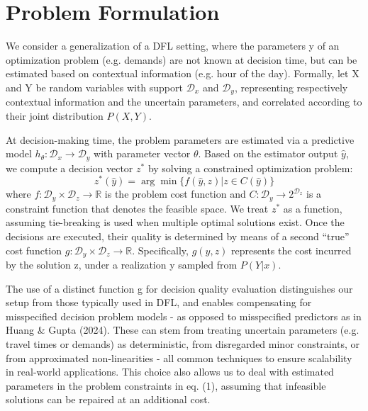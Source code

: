 \section{Problem Formulation}

We consider a generalization of a DFL setting, where the parameters y of an optimization problem (e.g. demands) are not known at decision time, but can be estimated based on contextual information (e.g. hour of the day). %
Formally, let X and Y be random variables with support $\mathcal{D}_{x}$ and $\mathcal{D}_{y}$, representing respectively contextual information and the uncertain parameters, and correlated according to their joint distribution $P(X,Y)$. %

At decision-making time, the problem parameters are estimated via a predictive model $h_{\theta}:\mathcal{D}_{x}\rightarrow \mathcal{D}_{y}$ with parameter vector $\theta$. %
Based on the estimator output $\hat{y}$, we compute a decision vector $z^{*}$ by solving a constrained optimization problem: %
\begin{equation}
    z^{*}(\hat{y})=\arg\min\{f(\hat{y},z)|z\in C(\hat{y})\} %
\end{equation}
where $f:\mathcal{D}_{y}\times \mathcal{D}_{z}\rightarrow\mathbb{R}$ is the problem cost function and $C:\mathcal{D}_{y}\rightarrow 2^{\mathcal{D}_{z}}$ is a constraint function that denotes the feasible space. %
We treat $z^{*}$ as a function, assuming tie-breaking is used when multiple optimal solutions exist. %
Once the decisions are executed, their quality is determined by means of a second ``true'' cost function $g:\mathcal{D}_{y}\times \mathcal{D}_{z}\rightarrow\mathbb{R}$. %
Specifically, $g(y,z)$ represents the cost incurred by the solution z, under a realization y sampled from $P(Y|x)$. %

The use of a distinct function g for decision quality evaluation distinguishes our setup from those typically used in DFL, and enables compensating for misspecified decision problem models - as opposed to misspecified predictors as in Huang \& Gupta (2024). %
These can stem from treating uncertain parameters (e.g. travel times or demands) as deterministic, from disregarded minor constraints, or from approximated non-linearities - all common techniques to ensure scalability in real-world applications. %
This choice also allows us to deal with estimated parameters in the problem constraints in eq. (1), assuming that infeasible solutions can be repaired at an additional cost. %


